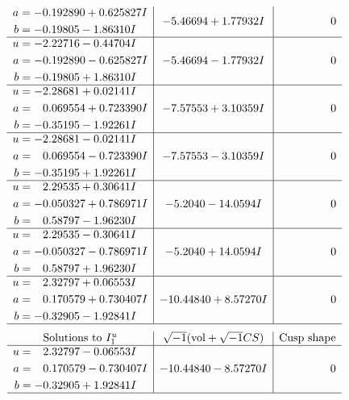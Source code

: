 \documentclass[1p]{elsarticle_modified}
\theoremstyle{definition}
\newcommand{\I}{\sqrt{-1}}
\begin{document}
$$\begin{array}{c|c|c}
\begin{aligned}
a &= -0.192890 + 0.625827 I \\
b &= -0.19805 - 1.86310 I\end{aligned}
 & -5.46694 + 1.77932 I & \phantom{-0.000000 } 0 \\ \hline\begin{aligned}
u &= -2.22716 - 0.44704 I \\
a &= -0.192890 - 0.625827 I \\
b &= -0.19805 + 1.86310 I\end{aligned}
 & -5.46694 - 1.77932 I & \phantom{-0.000000 } 0 \\ \hline\begin{aligned}
u &= -2.28681 + 0.02141 I \\
a &= \phantom{-}0.069554 + 0.723390 I \\
b &= -0.35195 - 1.92261 I\end{aligned}
 & -7.57553 + 3.10359 I & \phantom{-0.000000 } 0 \\ \hline\begin{aligned}
u &= -2.28681 - 0.02141 I \\
a &= \phantom{-}0.069554 - 0.723390 I \\
b &= -0.35195 + 1.92261 I\end{aligned}
 & -7.57553 - 3.10359 I & \phantom{-0.000000 } 0 \\ \hline\begin{aligned}
u &= \phantom{-}2.29535 + 0.30641 I \\
a &= -0.050327 + 0.786971 I \\
b &= \phantom{-}0.58797 - 1.96230 I\end{aligned}
 & -5.2040 - 14.0594 I & \phantom{-0.000000 } 0 \\ \hline\begin{aligned}
u &= \phantom{-}2.29535 - 0.30641 I \\
a &= -0.050327 - 0.786971 I \\
b &= \phantom{-}0.58797 + 1.96230 I\end{aligned}
 & -5.2040 + 14.0594 I & \phantom{-0.000000 } 0 \\ \hline\begin{aligned}
u &= \phantom{-}2.32797 + 0.06553 I \\
a &= \phantom{-}0.170579 + 0.730407 I \\
b &= -0.32905 - 1.92841 I\end{aligned}
 & -10.44840 + 8.57270 I & \phantom{-0.000000 } 0\\
 \hline 
 \end{array}$$\newpage$$\begin{array}{c|c|c}  
\text{Solutions to }I^u_{1}& \I (\text{vol} + \sqrt{-1}CS) & \text{Cusp shape}\\
 \hline 
\begin{aligned}
u &= \phantom{-}2.32797 - 0.06553 I \\
a &= \phantom{-}0.170579 - 0.730407 I \\
b &= -0.32905 + 1.92841 I\end{aligned}
 & -10.44840 - 8.57270 I & \phantom{-0.000000 } 0\\
 \hline 
 \end{array}$$\newpage\newpage\renewcommand{\arraystretch}{1}
\end{document}
